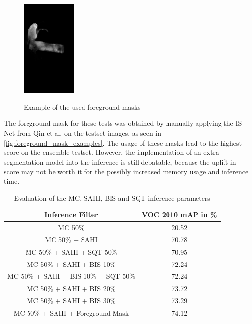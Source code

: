 \documentclass[10pt]{book}
\begin{document}
\begin{figure}
     {\includegraphics[width=0.24\textwidth]{image/foreground_mask_example_hand_mask}}
  \caption{Example of the used foreground masks}
  \label{fig:foreground_mask_examples}
\end{figure}

The foreground mask for these tests was obtained by manually applying the IS-Net from Qin et al. \cite{qin2022} on the testset images, as seen in \autoref{fig:foreground_mask_examples}. The usage of these masks lead to the highest score on the ensemble testset. However, the implementation of an extra segmentation model into the inference is still debatable, because the uplift in score may not be worth it for the possibly increased memory usage and inference time.

\begin{table}
  \begin{tabular}{ c c }
   Inference Filter & VOC 2010 \ac{mAP} in \% \\ 
   \hline
   \ac{MC} 50\% & 20.52 \\
   \ac{MC} 50\% + \ac{SAHI} & 70.78 \\
   \ac{MC} 50\% + \ac{SAHI} + \ac{SQT} 50\% & 70.95 \\
   \ac{MC} 50\% + \ac{SAHI} + \ac{BIS} 10\% & 72.24 \\
   \ac{MC} 50\% + \ac{SAHI} + \ac{BIS} 10\% + \ac{SQT} 50\% & 72.24 \\
   \ac{MC} 50\% + \ac{SAHI} + \ac{BIS} 20\% & 73.72 \\
   \ac{MC} 50\% + \ac{SAHI} + \ac{BIS} 30\% & 73.29 \\
   \ac{MC} 50\% + \ac{SAHI} + Foreground Mask & 74.12 \\
   \hline
  \end{tabular}
  \caption{\label{tab:inference_parameters}Evaluation of the \ac{MC}, \ac{SAHI}, \ac{BIS} and \ac{SQT} inference parameters}
\end{table} %
\end{document}
